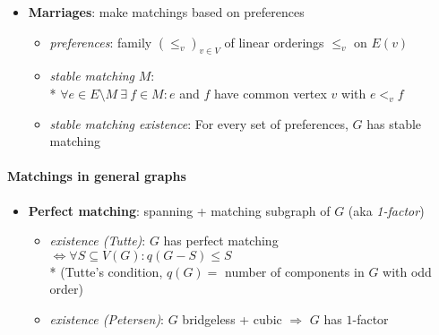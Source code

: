 \begin{itemize}
  \item \textbf{Marriages}: make matchings based on preferences
  \begin{itemize}
    \item \emph{preferences}: family $ (\leq_v)_{v \in V} $ of linear orderings $ \leq_v $ on $ E(v) $
    \item \emph{stable matching} $ M $: \\* $ \forall e \in E \setminus M \ \exists \ f \in M : e $ and $ f $ have common vertex $ v $ with $ e <_v f $
    \item \emph{stable matching existence}: For every set of preferences, $ G $ has stable matching
  \end{itemize}
\end{itemize}

\paragraph{Matchings in general graphs}
\begin{itemize}
  \item \textbf{Perfect matching}: spanning + matching subgraph of $ G $ (aka \emph{1-factor})
  \begin{itemize}
    \item \emph{existence (Tutte)}: $ G $ has perfect matching $ \Leftrightarrow \forall S \subseteq V(G) : q(G-S) \leq S $ \\*
      (Tutte's condition, $ q(G) = $ number of components in $ G $ with odd order)
    \item \emph{existence (Petersen)}: $ G $ bridgeless + cubic $ \Rightarrow $ $ G $ has $ 1 $-factor
  \end{itemize}
\end{itemize}